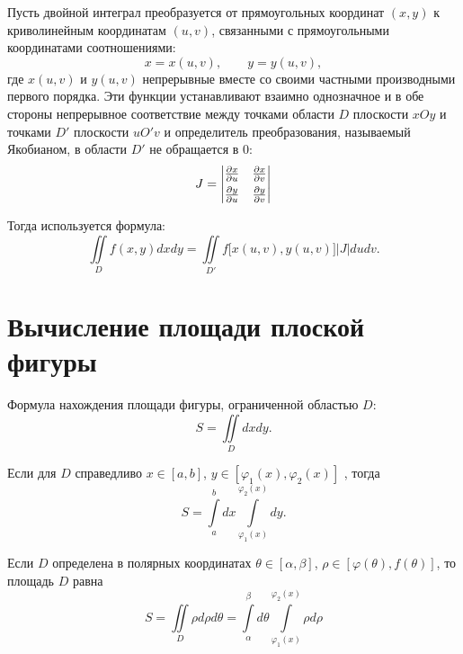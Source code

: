 \documentclass[a4paper,12pt,oneside]{extbook}
\theoremstyle{numbered}
\theoremstyle{unnumbered}
\theoremstyle{named}
\theoremstyle{unnumbered}
\theoremstyle{named}
\theoremstyle{named}
\theoremstyle{named}
\begin{document}
Пусть двойной интеграл преобразуется от прямоугольных координат \((x, y)\) к криволинейным координатам \((u, v)\), связанными с прямоугольными координатами соотношениями:
\begin{equation}
    x = x(u, v), \qquad y = y(u, v),
\end{equation}
где \(x(u, v)\) и \(y(u, v)\) непрерывные вместе со своими частными производными первого порядка. Эти функции устанавливают взаимно однозначное и в обе стороны непрерывное соответствие между точками области \(D\) плоскости \(xOy\) и точками \(D'\) плоскости \(uO'v\) и определитель преобразования, называемый Якобианом, в области \(D'\) не обращается в \(0\):
\begin{equation}
    J =
    \begin{vmatrix}
        \frac{\partial x}{\partial u} & \frac{\partial x}{\partial v}
        \vspace{4pt}                                                  \\
        \frac{\partial y}{\partial u} & \frac{\partial y}{\partial v}
    \end{vmatrix}
\end{equation}

Тогда используется формула:
\begin{equation}
    \iint\limits_{D} f(x, y)dxdy = \iint\limits_{D'} f\big[ x(u, v), y(u, v) \big] |J| du dv.
\end{equation}

\section{Вычисление площади плоской фигуры}
\label{sec:Вычисление площади плоской фигуры}

Формула нахождения площади фигуры, ограниченной областью \(D\):
\begin{equation}
    S = \iint\limits_{D} dxdy.
\end{equation}

Если для \(D\) справедливо \(x \in [a, b]\), \(y \in [\varphi_1(x), \varphi_2(x)]\) , тогда
\begin{equation}
    S = \int\limits_{a}^{b} dx \int\limits_{\varphi_1(x)}^{\varphi_2(x)} dy.
\end{equation}

Если \(D\) определена в полярных координатах \(\theta \in [\alpha, \beta]\), \(\rho \in [\varphi(\theta), f(\theta)]\), то площадь \(D\) равна
\begin{equation}
    S = \iint\limits_{D} \rho d\rho d\theta = \int\limits_{\alpha}^{\beta} d\theta \int\limits_{\varphi_1(x)}^{\varphi_2(x)} \rho d\rho
\end{equation}
\end{document}
